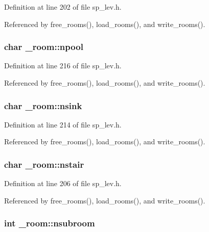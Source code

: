 Definition at line 202 of file sp\+\_\+lev.\+h.



Referenced by free\+\_\+rooms(), load\+\_\+rooms(), and write\+\_\+rooms().

\hypertarget{struct__room_a309691c7928482b72435ad884e731ee1}{
\subsubsection[{npool}]{\setlength{\rightskip}{0pt plus 5cm}char \+\_\+room\+::npool}}\label{struct__room_a309691c7928482b72435ad884e731ee1}


Definition at line 216 of file sp\+\_\+lev.\+h.



Referenced by free\+\_\+rooms(), load\+\_\+rooms(), and write\+\_\+rooms().

\hypertarget{struct__room_a49a3273df13628e3928da7ec7cd88d2c}{
\subsubsection[{nsink}]{\setlength{\rightskip}{0pt plus 5cm}char \+\_\+room\+::nsink}}\label{struct__room_a49a3273df13628e3928da7ec7cd88d2c}


Definition at line 214 of file sp\+\_\+lev.\+h.



Referenced by free\+\_\+rooms(), load\+\_\+rooms(), and write\+\_\+rooms().

\hypertarget{struct__room_a4c7178c7b2d6aae68c8bc575e65b4928}{
\subsubsection[{nstair}]{\setlength{\rightskip}{0pt plus 5cm}char \+\_\+room\+::nstair}}\label{struct__room_a4c7178c7b2d6aae68c8bc575e65b4928}


Definition at line 206 of file sp\+\_\+lev.\+h.



Referenced by free\+\_\+rooms(), load\+\_\+rooms(), and write\+\_\+rooms().

\hypertarget{struct__room_a33ab2c6401d14af02e880b4592738002}{
\subsubsection[{nsubroom}]{\setlength{\rightskip}{0pt plus 5cm}int \+\_\+room\+::nsubroom}}\label{struct__room_a33ab2c6401d14af02e880b4592738002}


